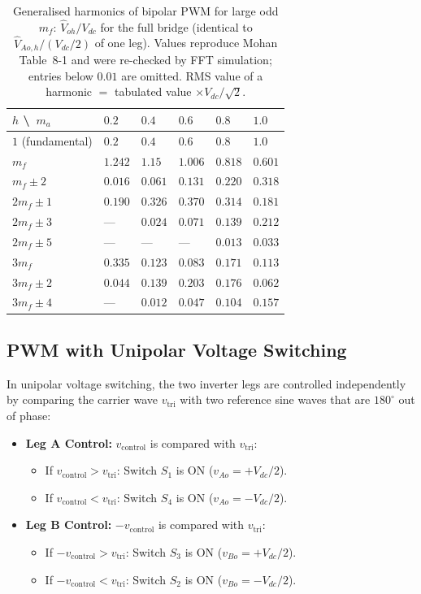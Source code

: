 \documentclass[11pt,a4paper]{article}
\let\origsubsection\subsection
\renewcommand{\subsection}{\Needspace{7\baselineskip}\origsubsection}
\begin{document}
\begin{table}[htbp]
\centering
\small
\caption{Generalised harmonics of bipolar PWM for large odd $m_f$: $\hat V_{oh}/V_{dc}$ for the full bridge (identical to $\hat V_{Ao,h}/(V_{dc}/2)$ of one leg). Values reproduce Mohan Table~8-1 and were re-checked by FFT simulation; entries below $0.01$ are omitted. RMS value of a harmonic $=$ tabulated value $\times V_{dc}/\sqrt{2}$.}
\label{tab:mohan81}
\begin{tabularx}{0.86\textwidth}{l Y Y Y Y Y}
\toprule
$h$ \textbackslash\ $m_a$ & $0.2$ & $0.4$ & $0.6$ & $0.8$ & $1.0$ \\
\midrule
$1$ (fundamental) & $0.2$ & $0.4$ & $0.6$ & $0.8$ & $1.0$ \\
$m_f$ & $1.242$ & $1.15$ & $1.006$ & $0.818$ & $0.601$ \\
$m_f \pm 2$ & $0.016$ & $0.061$ & $0.131$ & $0.220$ & $0.318$ \\
$2m_f \pm 1$ & $0.190$ & $0.326$ & $0.370$ & $0.314$ & $0.181$ \\
$2m_f \pm 3$ & --- & $0.024$ & $0.071$ & $0.139$ & $0.212$ \\
$2m_f \pm 5$ & --- & --- & --- & $0.013$ & $0.033$ \\
$3m_f$ & $0.335$ & $0.123$ & $0.083$ & $0.171$ & $0.113$ \\
$3m_f \pm 2$ & $0.044$ & $0.139$ & $0.203$ & $0.176$ & $0.062$ \\
$3m_f \pm 4$ & --- & $0.012$ & $0.047$ & $0.104$ & $0.157$ \\
\bottomrule
\end{tabularx}
\end{table}

\subsection{PWM with Unipolar Voltage Switching}

In unipolar voltage switching, the two inverter legs are controlled independently by comparing the carrier wave $v_{\text{tri}}$ with two reference sine waves that are $180^\circ$ out of phase:
\begin{itemize}[leftmargin=*]
  \item \textbf{Leg A Control:} $v_{\text{control}}$ is compared with $v_{\text{tri}}$:
  \begin{itemize}
    \item If $v_{\text{control}} > v_{\text{tri}}$: Switch $S_1$ is ON ($v_{Ao} = +V_{dc}/2$).
    \item If $v_{\text{control}} < v_{\text{tri}}$: Switch $S_4$ is ON ($v_{Ao} = -V_{dc}/2$).
  \end{itemize}
  \item \textbf{Leg B Control:} $-v_{\text{control}}$ is compared with $v_{\text{tri}}$:
  \begin{itemize}
    \item If $-v_{\text{control}} > v_{\text{tri}}$: Switch $S_3$ is ON ($v_{Bo} = +V_{dc}/2$).
    \item If $-v_{\text{control}} < v_{\text{tri}}$: Switch $S_2$ is ON ($v_{Bo} = -V_{dc}/2$).
  \end{itemize}
\end{itemize}
\end{document}
